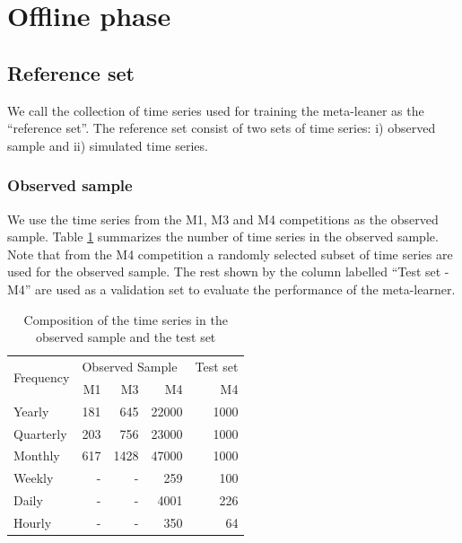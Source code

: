 \documentclass[11pt,a4paper,]{article}
\begin{document}
\section{Offline phase}\label{offline}

\subsection{Reference set}\label{reference-set}

We call the collection of time series used for training the meta-leaner
as the ``reference set''. The reference set consist of two sets of time
series: i) observed sample and ii) simulated time series.

\subsubsection{Observed sample}\label{observed-sample}

We use the time series from the M1, M3 and M4 competitions as the
observed sample. Table \ref{observedsample} summarizes the number of
time series in the observed sample. Note that from the M4 competition a
randomly selected subset of time series are used for the observed
sample. The rest shown by the column labelled ``Test set - M4'' are used
as a validation set to evaluate the performance of the meta-learner.

\begin{table}[!h]
\centering
\caption{Composition of the time series in the observed sample and the test set}
\label{observedsample}
\begin{tabular}{l|rrr|r}
\multirow{2}{*}{Frequency} & \multicolumn{3}{l|}{Observed Sample} & Test set \\
&   M1    &    M3   &    M4 & M4 \\ \hline
Yearly          &   181    &   645    &   22000 & 1000 \\
Quarterly       &   203    &    756   &   23000 & 1000\\
Monthly         &   617    &    1428   &  47000 & 1000\\
Weekly          &   -    &   -    &   259 & 100\\
Daily           &   -    &   -    &   4001 & 226\\
Hourly          &   -    &    -   &  350 & 64\\ \hline
\end{tabular}
\end{table}
\end{document}
